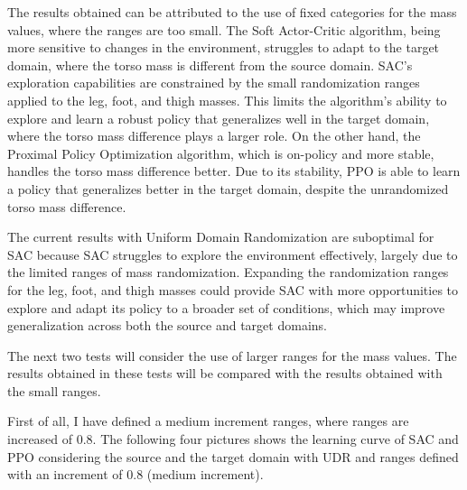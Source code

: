 \documentclass[11pt]{article}
\begin{document}
The results obtained can be attributed to the use of fixed categories for the mass values, where the ranges are too small. 
The Soft Actor-Critic algorithm, being more sensitive to changes in the environment, struggles to adapt to the target domain, where the torso mass is different from the source domain. SAC’s exploration capabilities are constrained by the small randomization ranges applied to the leg, foot, and thigh masses. This limits the algorithm's ability to explore and learn a robust policy that generalizes well in the target domain, where the torso mass difference plays a larger role.
On the other hand, the Proximal Policy Optimization algorithm, which is on-policy and more stable, handles the torso mass difference better. Due to its stability, PPO is able to learn a policy that generalizes better in the target domain, despite the unrandomized torso mass difference.

The current results with Uniform Domain Randomization are suboptimal for SAC because SAC struggles to explore the environment effectively, largely due to the limited ranges of mass randomization. Expanding the randomization ranges for the leg, foot, and thigh masses could provide SAC with more opportunities to explore and adapt its policy to a broader set of conditions, which may improve generalization across both the source and target domains. 

The next two tests will consider the use of larger ranges for the mass values. The results obtained in these tests will be compared with the results obtained with the small ranges.

First of all, I have defined a medium increment ranges, where ranges are increased of 0.8. The following four pictures shows the learning curve of SAC and PPO considering the source and the target domain with UDR and ranges defined with an increment of 0.8 (medium increment).
\end{document}
